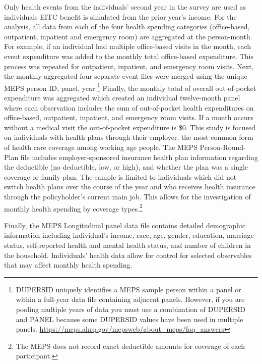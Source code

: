 \documentclass[smallcondensed,referee]{svjour3}
\begin{document}
Only health events from the individuals' second year in the survey are used as individuals EITC benefit is simulated from the prior year's income.  For the analysis, all data from each of the four health spending categories (office-based, outpatient, inpatient and emergency room) are aggregated at the person-month.  For example, if an individual had multiple office-based visits in the month, each event expenditure was added to the monthly total office-based expenditure. This process was repeated for outpatient, inpatient, and emergency room visits. Next, the monthly aggregated four separate event files were merged using the unique MEPS person ID, panel, year \footnote{ DUPERSID uniquely identifies a MEPS sample person within a panel or within a full-year data file containing adjacent panels. However, if you are pooling multiple years of data you must use a combination of DUPERSID and PANEL because some DUPERSID values have been used in multiple panels. \url{https://meps.ahrq.gov/mepsweb/about_meps/faq_answers}} Finally, the monthly total of overall out-of-pocket expenditure was aggregated which created an individual twelve-month panel where each observation includes the sum of out-of-pocket health expenditures on office-based, outpatient, inpatient, and emergency room visits. If a month occurs without a medical visit the out-of-pocket expenditure is \$0. This study is focused on individuals with health plans through their employer, the most common form of health care coverage among working age people.  The MEPS Person-Round-Plan file includes employer-sponsored insurance health plan information regarding the deductible (no deductible, low, or high), and whether the plan was a single coverage or family plan. The sample is limited to individuals which did not switch health plans over the course of the year and who receives health insurance through the policyholder's current main job. This allows for the investigation of monthly health spending by coverage types.\footnote{The MEPS  does not record exact deductible amounts for coverage of each participant.} 


Finally, the MEPS Longitudinal panel data file contains detailed demographic information including individual's income, race, age, gender, education, marriage status, self-reported health and mental health status, and number of children in the household. Individuals' health data allow for control for selected observables that may affect monthly health spending. 
\end{document}
